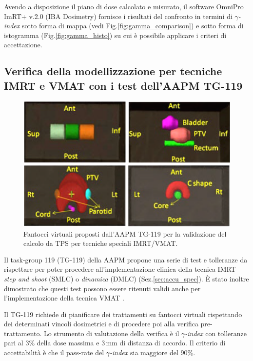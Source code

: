Avendo a disposizione il piano di dose calcolato e misurato, il software OmniPro ImRT+ v.2.0 (IBA Dosimetry) fornisce i risultati del confronto in termini di $\gamma$\textit{-index} sotto forma di mappa (vedi Fig.\ref{fig:gamma_comparison}) e sotto forma di istogramma (Fig.\ref{fig:gamma_histo}) su cui è possibile applicare i criteri di accettazione.

\subsection{Verifica della modellizzazione per tecniche IMRT e VMAT con i test dell'AAPM TG-119}
\begin{figure}
\centering
\includegraphics[width=.8\textwidth]{./cap2/TG119_phantoms}
\caption{Fantocci virtuali proposti dall'AAPM TG-119 \cite{Ezzell2009} per la validazione del calcolo da TPS per tecniche speciali IMRT/VMAT.}
\label{fig:TG119_phantoms}
\end{figure}

Il task-group 119 (TG-119) della AAPM \cite{Ezzell2009} propone una serie di test e tolleranze da rispettare per poter procedere all'implementazione clinica della tecnica IMRT \textit{step and shoot} (SMLC) o \textit{dinamica} (DMLC) (Sez.\ref{sec:accu_spec}). \`E stato inoltre dimostrato che questi test possono essere ritenuti validi anche per l'implementazione della tecnica VMAT \cite{Mynampati2012}.

Il TG-119 richiede di pianificare dei trattamenti su fantocci virtuali rispettando dei determinati vincoli dosimetrici e di procedere poi alla verifica pre-trattamento. Lo strumento di valutazione della verifica è il $\gamma$\textit{-index} con tolleranze pari al 3\% della dose massima e $3\,$mm di distanza di accordo. Il criterio di accettabilità è che il pass-rate del $\gamma$\textit{-index} sia maggiore del 90\%.

